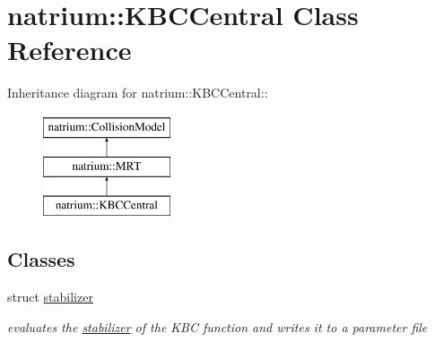 \hypertarget{classnatrium_1_1KBCCentral}{
\section{natrium::KBCCentral Class Reference}
\label{classnatrium_1_1KBCCentral}
}
Inheritance diagram for natrium::KBCCentral::\begin{figure}[H]
\begin{center}
\leavevmode
\includegraphics[height=3cm]{classnatrium_1_1KBCCentral}
\end{center}
\end{figure}
\subsection*{Classes}
\begin{DoxyCompactItemize}
\item 
struct \hyperlink{structnatrium_1_1KBCCentral_1_1stabilizer}{stabilizer}
\begin{DoxyCompactList}\small\item\em evaluates the \hyperlink{structnatrium_1_1KBCCentral_1_1stabilizer}{stabilizer} of the KBC function and writes it to a parameter file \item\end{DoxyCompactList}\end{DoxyCompactItemize}
